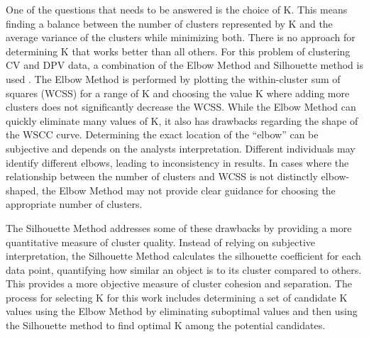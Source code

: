 One of the questions that needs to be answered is the choice of K. This means finding a balance between the number of clusters represented by K and the average variance of the clusters while minimizing both. There is no approach for determining K that works better than all others. For this problem of clustering CV and DPV data, a combination of the Elbow Method \cite{Thorndike1953} and Silhouette method is used \cite{ROUSSEEUW198753}. The Elbow Method is performed by plotting the within-cluster sum of squares (WCSS) for a range of K and choosing the value K where adding more clusters does not significantly decrease the WCSS. While the Elbow Method can quickly eliminate many values of K, it also has drawbacks regarding the shape of the WSCC curve. Determining the exact location of the \enquote{elbow} can be subjective and depends on the analyst\textquotesingle s interpretation. Different individuals may identify different elbows, leading to inconsistency in results. In cases where the relationship between the number of clusters and WCSS is not distinctly elbow-shaped, the Elbow Method may not provide clear guidance for choosing the appropriate number of clusters.

The Silhouette Method addresses some of these drawbacks by providing a more quantitative measure of cluster quality. Instead of relying on subjective interpretation, the Silhouette Method calculates the silhouette coefficient for each data point, quantifying how similar an object is to its cluster compared to others. This provides a more objective measure of cluster cohesion and separation. The process for selecting K for this work includes determining a set of candidate K values using the Elbow Method by eliminating suboptimal values and then using the Silhouette method to find optimal K among the potential candidates. 
